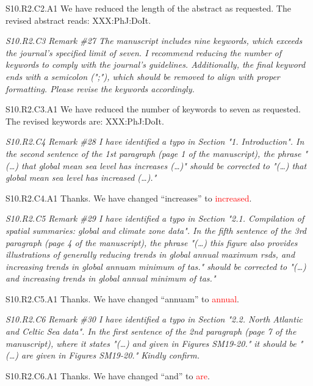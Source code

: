 \documentclass[a4paper,10pt]{article}
\newcommand{\ed}[1]{\textcolor{red}{#1}}
\begin{document}
	S10.R2.C2.A1 We have reduced the length of the abstract as requested. The revised abstract reads: XXX:PhJ:DoIt.

	\emph{S10.R2.C3 Remark \#27 The manuscript includes nine keywords, which exceeds the journal's specified limit of seven. I recommend reducing the number of keywords to comply with the journal's guidelines. Additionally, the final keyword ends with a semicolon (";"), which should be removed to align with proper formatting. Please revise the keywords accordingly.}

	S10.R2.C3.A1 We have reduced the number of keywords to seven as requested. The revised keywords are: XXX:PhJ:DoIt.

	\emph{S10.R2.C4 Remark \#28 I have identified a typo in Section "1. Introduction". In the second sentence of the 1st paragraph (page 1 of the manuscript), the phrase "(…) that global mean sea level has increases (…)" should be corrected to "(…) that global mean sea level has increased (…)."}

	S10.R2.C4.A1 Thanks. We have changed ``increases'' to \ed{increased}.

	\emph{S10.R2.C5 Remark \#29 I have identified a typo in Section "2.1. Compilation of spatial summaries: global and climate zone data". In the fifth sentence of the 3rd paragraph (page 4 of the manuscript), the phrase "(…) this figure also provides illustrations of generally reducing trends in global annual maximum rsds, and increasing trends in global annuam minimum of tas." should be corrected to "(…) and increasing trends in global annual minimum of tas."}

	S10.R2.C5.A1 Thanks. We have changed ``annuam'' to \ed{annual}.

	\emph{S10.R2.C6 Remark \#30 I have identified a typo in Section "2.2. North Atlantic and Celtic Sea data". In the first sentence of the 2nd paragraph (page 7 of the manuscript), where it states "(…) and given in Figures SM19-20." it should be "(…) are given in Figures SM19-20." Kindly confirm.}

	S10.R2.C6.A1 Thanks. We have changed ``and'' to \ed{are}.
\end{document}
